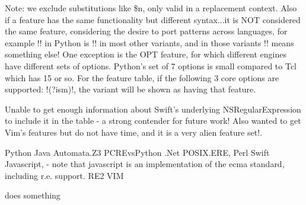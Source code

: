Note: we exclude substitutions like \$n, only valid in a replacement context.  Also if a feature has the same functionality but different syntax...it is NOT considered the same feature, considering the desire to port patterns across languages, for example \cverb!\Z! in Python is \cverb!\z! in most other variants, and in those variants \cverb!\Z! means something else!  One exception is the OPT feature, for which different engines have different sets of options.  Python's set of 7 options is small compared to Tcl which has 15 or so.  For the feature table, if the following 3 core options are supported: \cverb!(?ism)!, the variant will be shown as having that feature.

Unable to get enough information about Swift's underlying NSRegularExpression to include it in the table - a strong contender for future work!  Also wanted to get Vim's features but do not have time, and it is a very alien feature set!.

% 


Python
Java
Automata.Z3
PCREvsPython
.Net
POSIX.ERE,
Perl
Swift
Javascript,
- note that javascript is an implementation of the ecma standard, including r.e. support.
RE2
VIM



\begin{description} \itemsep -1pt
\item [FTR1] does something 
\end{description}
